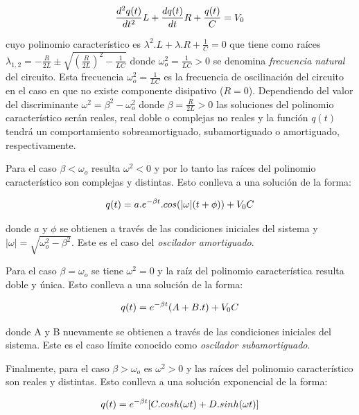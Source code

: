 \documentclass[11pt,a4paper]{article}
\begin{document}
\begin{equation}{\label{ec_RCL}}
\frac{d^2q(t)}{dt^2}L+\frac{dq(t)}{dt}R+\frac{q(t)}{C} = V_0
\end{equation}

cuyo polinomio característico es $\lambda^2.L+\lambda.R+\frac{1}{C} = 0$ que tiene como raíces $\lambda_{1,2} = -\frac{R}{2L} \pm \sqrt{(\frac{R}{2L})^2-\frac{1}{LC}}$ donde $\omega_o^2 = \frac{1}{LC}>0$ se denomina \textit{frecuencia natural} del circuito. Esta frecuencia $\omega_o^2 = \frac{1}{LC}$ es la frecuencia de oscilinación del circuito en el caso en que no existe componente disipativo ($R=0$). Dependiendo del valor del discriminante $\omega^2 = \beta^2-\omega_o^2$ donde $\beta = \frac{R}{2L}>0$ las soluciones del polinomio característico serán reales, real doble o complejas no reales y la función $q(t)$ tendrá un comportamiento sobreamortiguado, subamortiguado o amortiguado, respectivamente. 

Para el caso $\beta < \omega_o$ resulta $\omega^2 < 0$ y por lo tanto las raíces del polinomio característico son complejas y distintas. Esto conlleva a una solución de la forma:

\begin{equation}{\label{amort}}
q(t) = a.e^{-\beta t}.cos(|\omega|(t+\phi)) + V_0C
\end{equation}

donde $a$ y $\phi$ se obtienen a través de las condiciones iniciales del sistema y $|\omega| = \sqrt{\omega_o^2-\beta^2}$. Este es el caso del \textit{oscilador amortiguado}.

Para el caso $\beta = \omega_o$ se tiene $\omega^2 = 0$ y la raíz del polinomio característica resulta doble y única. Esto conlleva a una solución de la forma:

\begin{equation}{\label{sub}}
q(t) = e^{-\beta t}(A+B.t) + V_0C
\end{equation}

donde A y B nuevamente se obtienen a través de las condiciones iniciales del sistema. Este es el caso límite conocido como \textit{oscilador subamortiguado}.

Finalmente, para el caso $\beta > \omega_o$ es $\omega^2>0$ y las raíces del polinomio característico son reales y distintas. Esto conlleva a una solución exponencial de la forma:

\begin{equation}{\label{sobre}}
q(t) = e^{-\beta t}[C.cosh(\omega t)+D.sinh(\omega t)]
\end{equation}
\end{document}
